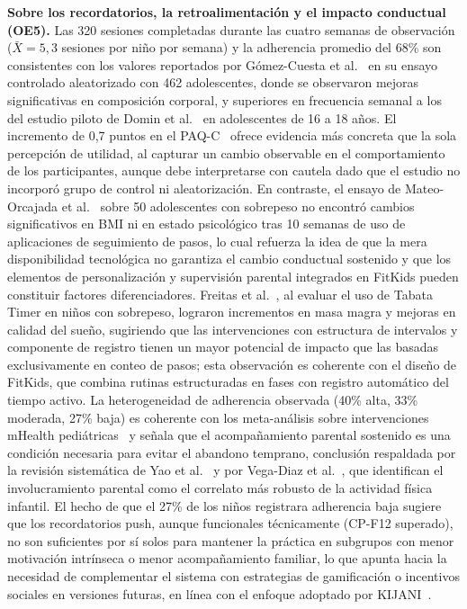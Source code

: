 			\textbf{Sobre los recordatorios, la retroalimentación y el impacto conductual (OE5).} Las 320 sesiones completadas durante las cuatro semanas de observación ($\bar{X} = 5{,}3$ sesiones por niño por semana) y la adherencia promedio del 68\% son consistentes con los valores reportados por Gómez-Cuesta et al.~\cite{GomezCuesta2024} en su ensayo controlado aleatorizado con 462 adolescentes, donde se observaron mejoras significativas en composición corporal, y superiores en frecuencia semanal a los del estudio piloto de Domin et al.~\cite{Domin2022} en adolescentes de 16 a 18 años. El incremento de 0,7 puntos en el PAQ-C~\cite{Kowalski2004,Benitez2016} ofrece evidencia más concreta que la sola percepción de utilidad, al capturar un cambio observable en el comportamiento de los participantes, aunque debe interpretarse con cautela dado que el estudio no incorporó grupo de control ni aleatorización. En contraste, el ensayo de Mateo-Orcajada et al.~\cite{MateoOrcajada2024} sobre 50 adolescentes con sobrepeso no encontró cambios significativos en BMI ni en estado psicológico tras 10 semanas de uso de aplicaciones de seguimiento de pasos, lo cual refuerza la idea de que la mera disponibilidad tecnológica no garantiza el cambio conductual sostenido y que los elementos de personalización y supervisión parental integrados en FitKids pueden constituir factores diferenciadores. Freitas et al.~\cite{Freitas2024}, al evaluar el uso de Tabata Timer en niños con sobrepeso, lograron incrementos en masa magra y mejoras en calidad del sueño, sugiriendo que las intervenciones con estructura de intervalos y componente de registro tienen un mayor potencial de impacto que las basadas exclusivamente en conteo de pasos; esta observación es coherente con el diseño de FitKids, que combina rutinas estructuradas en fases con registro automático del tiempo activo. La heterogeneidad de adherencia observada (40\% alta, 33\% moderada, 27\% baja) es coherente con los meta-análisis sobre intervenciones mHealth pediátricas~\cite{Domin2022,Schoeppe2017} y señala que el acompañamiento parental sostenido es una condición necesaria para evitar el abandono temprano, conclusión respaldada por la revisión sistemática de Yao et al.~\cite{Yao2015} y por Vega-Diaz et al.~\cite{VegaDiaz2023}, que identifican el involucramiento parental como el correlato más robusto de la actividad física infantil. El hecho de que el 27\% de los niños registrara adherencia baja sugiere que los recordatorios push, aunque funcionales técnicamente (CP-F12 superado), no son suficientes por sí solos para mantener la práctica en subgrupos con menor motivación intrínseca o menor acompañamiento familiar, lo que apunta hacia la necesidad de complementar el sistema con estrategias de gamificación o incentivos sociales en versiones futuras, en línea con el enfoque adoptado por KIJANI~\cite{Willinger2024}.
			
